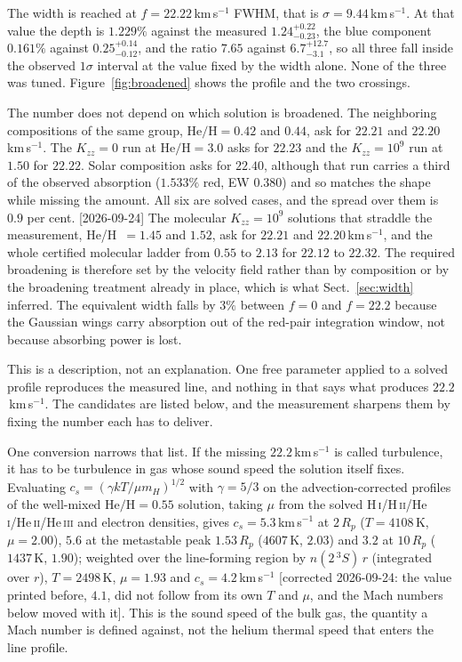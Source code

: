 \documentclass[english,a4paper]{my_memo}
\begin{document}
The width is reached at $f = 22.22$\,km\,s$^{-1}$ FWHM, that is
$\sigma = 9.44$\,km\,s$^{-1}$. At that value the depth is $1.229\%$ against
the measured $1.24^{+0.22}_{-0.23}$, the blue component $0.161\%$ against
$0.25^{+0.14}_{-0.12}$, and the ratio $7.65$ against $6.7^{+12.7}_{-3.1}$, so
all three fall inside the observed $1\sigma$ interval at the value fixed by
the width alone. None of the three was tuned. Figure~\ref{fig:broadened}
shows the profile and the two crossings.

The number does not depend on which solution is broadened. The neighboring
compositions of the same group, $\mathrm{He/H} = 0.42$ and $0.44$, ask for
$22.21$ and $22.20$\,km\,s$^{-1}$. The $K_{zz} = 0$ run at
$\mathrm{He/H} = 3.0$ asks for $22.23$ and the $K_{zz} = 10^{9}$ run at
$1.50$ for $22.22$. Solar composition asks for $22.40$, although that run
carries a third of the observed absorption ($1.533\%$ red, EW $0.380$) and so
matches the shape while missing the amount. All six are solved cases, and the
spread over them is $0.9$ per cent. [2026-09-24] The molecular
$K_{zz} = 10^{9}$ solutions that straddle the measurement, He/H~$=1.45$ and
$1.52$, ask for $22.21$ and $22.20$\,km\,s$^{-1}$, and the whole certified
molecular ladder from $0.55$ to $2.13$ for $22.12$ to $22.32$. The required broadening is therefore set
by the velocity field rather than by composition or by the broadening
treatment already in place, which is what Sect.~\ref{sec:width} inferred. The
equivalent width falls by $3\%$ between $f = 0$ and $f = 22.2$ because the
Gaussian wings carry absorption out of the red-pair integration window, not
because absorbing power is lost.

This is a description, not an explanation. One free parameter applied to a
solved profile reproduces the measured line, and nothing in that says what
produces $22.2$\,km\,s$^{-1}$. The candidates are listed below, and the
measurement sharpens them by fixing the number each has to deliver.

One conversion narrows that list. If the missing $22.2$\,km\,s$^{-1}$ is
called turbulence, it has to be turbulence in gas whose sound speed the
solution itself fixes. Evaluating $c_s = (\gamma kT/\mu m_H)^{1/2}$ with
$\gamma = 5/3$ on the advection-corrected profiles of the well-mixed
$\mathrm{He/H} = 0.55$ solution, taking $\mu$ from the solved
H\,\textsc{i}/H\,\textsc{ii}/He\,\textsc{i}/He\,\textsc{ii}/He\,\textsc{iii}
and electron densities, gives $c_s = 5.3$\,km\,s$^{-1}$ at $2\,R_p$
($T = 4108$\,K, $\mu = 2.00$), $5.6$ at the metastable peak $1.53\,R_p$
($4607$\,K, $2.03$) and $3.2$ at $10\,R_p$ ($1437$\,K, $1.90$); weighted over
the line-forming region by $n(2\,^3S)\,r$ (integrated over $r$), $T = 2498$\,K,
$\mu = 1.93$ and $c_s = 4.2$\,km\,s$^{-1}$ [corrected 2026-09-24: the value
printed before, $4.1$, did not follow from its own $T$ and $\mu$, and the
Mach numbers below moved with it]. This is the sound speed of the bulk gas, the
quantity a Mach number is defined against, not the helium thermal speed that
enters the line profile.
\end{document}
